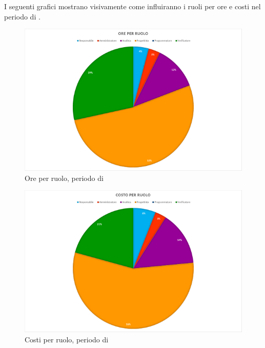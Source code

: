 I seguenti grafici mostrano visivamente come influiranno i ruoli per ore e costi nel periodo di \PA.
\begin{figure}[H]
	\centering
	\includegraphics[width=14cm]{img_peconomico/PA_OR.png}
	\caption{Ore per ruolo, periodo di \PA}
\end{figure}
\begin{figure}[H]
	\centering
	\includegraphics[width=14cm]{img_peconomico/PA_CR.png}
	\caption{Costi per ruolo, periodo di \PA}
\end{figure}

